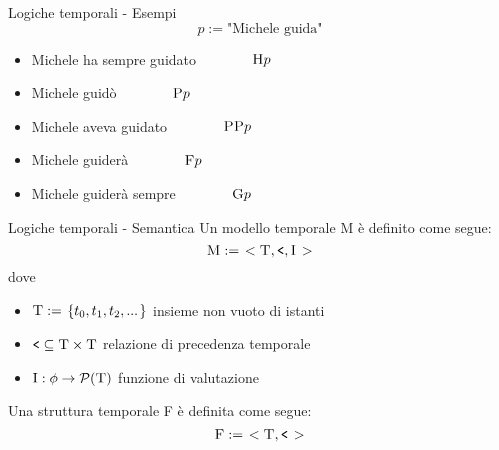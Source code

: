 \documentclass{beamer}
\begin{document}
\begin{frame}{Logiche temporali - Esempi}
    $$p := \text{"Michele guida"}$$
    \begin{itemize}
        \item Michele ha sempre guidato\tab $\hspace{40pt} \textsc{H}p$\medskip
        \item Michele guidò\tab $\hspace{40pt} \textsc{P}p$\medskip
        \item Michele aveva guidato\tab $\hspace{40pt} \textsc{PP}p$\medskip
        \item Michele guiderà\tab $\hspace{40pt} \textsc{F}p$\medskip
        \item Michele guiderà sempre\tab $\hspace{40pt} \textsc{G}p$
    \end{itemize}
\end{frame}

\begin{frame}{Logiche temporali - Semantica}
    Un modello temporale \textsc{M} è definito come segue:
    $$\textsc{M} := \left.<\textsc{T}, \texttt{<}, \textsc{I}\right.>$$
    dove
    \begin{itemize}
        \item $\textsc{T} := \left.\{t_0, t_1, t_2, ... \right.\}$ insieme non vuoto di istanti
        \item $\texttt{<} \subseteq \textsc{T}\times\textsc{T}$ relazione di precedenza temporale
        \item $\textsc{I}: \phi \to \mathcal{P}(\textsc{T})$ funzione di valutazione
    \end{itemize}
    \endgraf
    \bigskip
    Una struttura temporale \textsc{F} è definita come segue:
    $$\textsc{F} := \left.<\textsc{T}, \texttt{<}\right.>$$
\end{frame}
\end{document}

